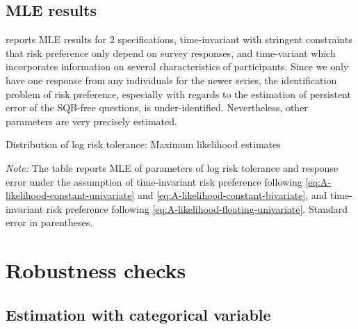 \documentclass[emulatestandardclasses, 10pt, abstract = true]{scrartcl}
\begin{document}
\subsection{MLE results} \label{appendix-B}

 reports MLE results for 2 specifications, time-invariant with stringent constraints that risk preference only depend on survey responses, and time-variant which incorporates information on several characteristics of participants. Since we only have one response from any individuals for the newer series, the identification problem of risk preference, especially with regards to the estimation of persistent error of the SQB-free questions, is under-identified. Nevertheless, other parameters are very precisely estimated.
\parskip 0cm
\begin{table}[!htbp]
	\centering \setlength{\extrarowheight}{0.3em}
	\caption{Distribution of log risk tolerance: Maximum likelihood estimates}
	\begin{threeparttable}
		
		\begin{tablenotes}[flushleft]\footnotesize
			\item \textit{Note: }The table reports MLE of parameters of log risk tolerance and response error under the assumption of time-invariant risk preference following \eqref{eq:A-likelihood-constant-univariate} and \eqref{eq:A-likelihood-constant-bivariate}, and time-invariant risk preference following \eqref{eq:A-likelihood-floating-univariate}. Standard error in parentheses.
		\end{tablenotes}
	\end{threeparttable}
	\label{table:appendix-mle}
\end{table}


\parskip 0cm

\pagebreak



\section{Robustness checks}
\subsection{Estimation with categorical variable}
\end{document}
